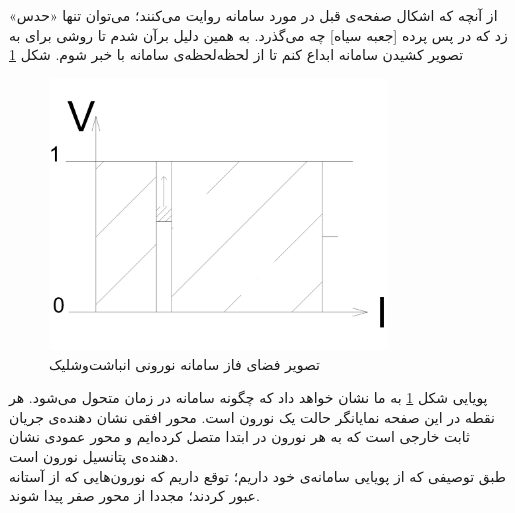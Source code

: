 از آنچه که اشکال صفحه‌ی قبل در مورد سامانه روایت می‌کنند؛ می‌توان تنها «حدس» زد که در پس پرده [جعبه سیاه] چه می‌گذرد. به همین دلیل برآن شدم تا روشی برای به تصویر کشیدن سامانه ابداع کنم تا از لحظه‌لحظه‌ی سامانه با خبر شوم. شکل \ref{fig:if_animation_plot}

\begin{figure}[h]
	\centering
	\includegraphics[width =0.8\textwidth]{figs/IF/IF_phase_space-Model.png}
	\caption{تصویر فضای فاز سامانه نورونی انباشت‌وشلیک}
	\label{fig:if_animation_plot}
\end{figure}

پویایی شکل \ref{fig:if_animation_plot} به ما نشان خواهد داد که چگونه سامانه در زمان متحول می‌شود. هر نقطه در این صفحه نمایانگر حالت یک نورون است. محور افقی نشان دهنده‌ی جریان ثابت خارجی است که به هر نورون در ابتدا متصل کرده‌ایم و محور عمودی نشان دهنده‌ی پتانسیل نورون است.\\
طبق توصیفی که از پویایی سامانه‌ی خود داریم؛ توقع داریم که نورون‌هایی که از آستانه عبور کردند؛ مجددا از محور صفر پیدا شوند.
